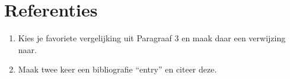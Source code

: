 \documentclass{article}
\begin{document}
\section{Referenties}
\begin{enumerate}
	\item Kies je favoriete vergelijking uit Paragraaf 3 en maak daar een verwijzing naar.
	\item Maak twee keer een bibliografie ``entry'' en citeer deze.
\end{enumerate}
\end{document}
